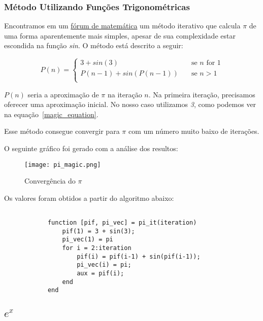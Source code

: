 		\subsubsection{Método Utilizando Funções Trigonométricas}

			Encontramos em um
			\href{http://mathforum.org/library/drmath/view/65244.html}{fórum de
			matemática} um método iterativo que calcula $ \pi $ de uma forma
			aparentemente mais simples, apesar de sua complexidade estar
			escondida na função \emph{sin}. O método está descrito a seguir:

			\begin{equation}
			\label{magic_equation}
				P(n) =
				\begin{cases}
					3 + sin (3) & \quad \text{se } n \text{\ for } 1\\
					P(n-1) + sin(P(n-1)) & \quad \text{se } n > 1\\
				\end{cases}
			\end{equation}

			$P(n)$ seria a aproximação de $\pi$ na iteração $n$. Na primeira
			iteração, precisamos oferecer uma aproximação inicial. No nosso caso
			utilizamos \emph{3}, como podemos ver na
			equação~\ref{magic_equation}.
			
			Esse método consegue convergir para $\pi$ com um número muito baixo
			de iterações.

			

			O seguinte gráfico foi gerado com a análise dos resultos:

			\begin{figure}[H]
				\centering
				\texttt{[image: pi\_magic.png]}
				\caption{Convergência do $\pi$}
				\label{fig:pi-magic}
			\end{figure}

			Os valores foram obtidos a partir do algoritmo abaixo:

			\begin{lstlisting}

			function [pif, pi_vec] = pi_it(iteration)
				pif(1) = 3 + sin(3);
				pi_vec(1) = pi
				for i = 2:iteration
					pif(i) = pif(i-1) + sin(pif(i-1));
					pi_vec(i) = pi;
					aux = pif(i);
				end
			end

			\end{lstlisting}

	\subsection{$e^x$}


